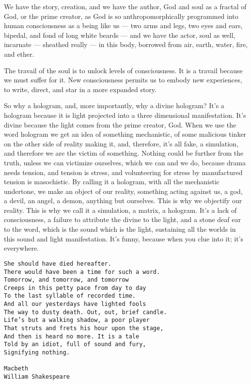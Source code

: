 We have the story, creation, and we have the author, God and soul as a
fractal of God, or the prime creator, as God is so anthropomorphically
programmed into human consciousness as a being like us --- two arms and
legs, two eyes and ears, bipedal, and fond of long white beards --- and
we have the actor, soul as well, incarnate --- sheathed really --- in
this body, borrowed from air, earth, water, fire, and ether.

The travail of the soul is to unlock levels of consciousness. It is a
travail because we must suffer for it. New consciousness permits us to
embody new experiences, to write, direct, and star in a more expanded
story.

So why a hologram, and, more importantly, why a divine hologram? It's a
hologram because it is light projected into a three dimensional
manifestation. It's divine because the light comes from the prime
creator, God. When we use the word hologram we get an idea of something
mechanistic, of some malicious tinker on the other side of reality
making it, and, therefore, it's all fake, a simulation, and therefore we
are the victim of something. Nothing could be further from the truth,
unless we can victimize ourselves, which we can and we do, because drama
needs tension, and tension is stress, and volunteering for stress by
manufactured tension is masochistic. By calling it a hologram, with all
the mechanistic undertone, we make an object of our reality, something
acting against us, a god, a devil, an angel, a demon, anything but
ourselves. This is why we objectify our reality. This is why we call it
a simulation, a matrix, a hologram. It's a lack of consciousness, a
failure to attribute the divine to the light, and a stone deaf ear to
the word, which is the sound which is the light, sustaining all the
worlds in this sound and light manifestation. It's funny, because when
you clue into it; it's everywhere.

\begin{verbatim}
She should have died hereafter.
There would have been a time for such a word.
Tomorrow, and tomorrow, and tomorrow
Creeps in this petty pace from day to day
To the last syllable of recorded time.
And all our yesterdays have lighted fools
The way to dusty death. Out, out, brief candle.
Life’s but a walking shadow, a poor player
That struts and frets his hour upon the stage,
And then is heard no more. It is a tale
Told by an idiot, full of sound and fury,
Signifying nothing.

Macbeth
William Shakespeare
\end{verbatim}

